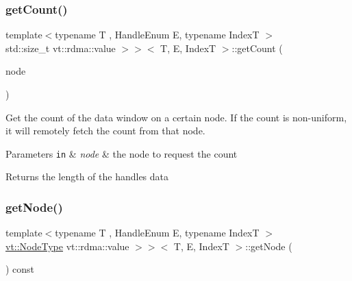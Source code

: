 \subsubsection{\texorpdfstring{get\+Count()}{getCount()}}
{\footnotesize\ttfamily template$<$typename T , Handle\+Enum E, typename IndexT $>$ \\
std\+::size\+\_\+t vt\+::rdma\+::value $>$$>$$<$ T, E, IndexT $>$\+::get\+Count (\begin{DoxyParamCaption}\item[{\hyperlink{namespacevt_a866da9d0efc19c0a1ce79e9e492f47e2}{vt\+::\+Node\+Type}}]{node }\end{DoxyParamCaption})}



Get the count of the data window on a certain node. If the count is non-\/uniform, it will remotely fetch the count from that node. 


\begin{DoxyParams}[1]{Parameters}
\mbox{\tt in}  & {\em node} & the node to request the count\\
\hline
\end{DoxyParams}
\begin{DoxyReturn}{Returns}
the length of the handle\textquotesingle{}s data 
\end{DoxyReturn}
\mbox{\label{structvt_1_1rdma_1_1_handle_3_01_t_00_01_e_00_01_index_t_00_01typename_01std_1_1enable__if__t_3_d15dac1b5db6e2bc0fb0b8aca42b1456_a7b01122fa292c1a2202c42a877ea207b}} 
\subsubsection{\texorpdfstring{get\+Node()}{getNode()}}
{\footnotesize\ttfamily template$<$typename T , Handle\+Enum E, typename IndexT $>$ \\
\hyperlink{namespacevt_a866da9d0efc19c0a1ce79e9e492f47e2}{vt\+::\+Node\+Type} vt\+::rdma\+::value $>$$>$$<$ T, E, IndexT $>$\+::get\+Node (\begin{DoxyParamCaption}{ }\end{DoxyParamCaption}) const\hspace{0.3cm}{\ttfamily [inline]}}



